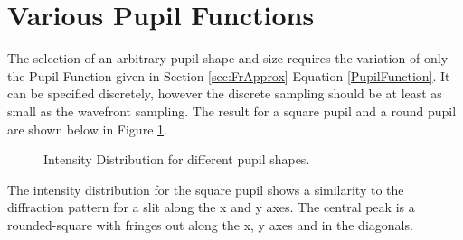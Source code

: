\section{Various Pupil Functions}

The selection of an arbitrary pupil shape and size requires the variation of only the Pupil Function given in Section \ref{sec:FrApprox} Equation \ref{PupilFunction}.  It can be specified discretely, however the discrete sampling should be at least as small as the wavefront sampling.  The result for a square pupil and a round pupil are shown below in Figure \ref{fig:Pupils}.

\begin{figure}[H]
    \hfill
	\caption{Intensity Distribution for different pupil shapes.}
	\label{fig:Pupils}
\end{figure}

The intensity distribution for the square pupil shows a similarity to the diffraction pattern for a slit along the x and y axes.  The central peak is a rounded-square with fringes out along the x, y axes and in the diagonals.  